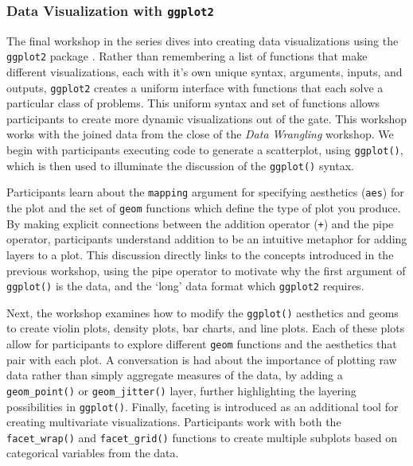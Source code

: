 \documentclass[12pt]{article}
\begin{document}
\subsubsection{Data Visualization with \texttt{ggplot2}}
\label{sec:vizual} 

\quad The final workshop in the series dives into creating data visualizations using the \texttt{ggplot2} package \citep{ggplot}. Rather than remembering a list of functions that make different visualizations, each with it's own unique syntax, arguments, inputs, and outputs, \texttt{ggplot2} creates a uniform interface with functions that each solve a particular class of problems. This uniform syntax and set of functions allows participants to create more dynamic visualizations out of the gate. This workshop works with the joined data from the close of the \emph{Data Wrangling} workshop. We begin with participants executing code to generate a scatterplot, using \texttt{ggplot()}, which is then used to illuminate the discussion of the \texttt{ggplot()} syntax.


\quad Participants learn about the \texttt{mapping} argument for specifying aesthetics (\texttt{aes}) for the plot and the set of \texttt{geom} functions which define the type of plot you produce. By making explicit connections between the addition operator (\texttt{+}) and the pipe operator, participants understand addition to be an intuitive metaphor for adding layers to a plot. This discussion directly links to the concepts introduced in the previous workshop, using the pipe operator to motivate why the first argument of \texttt{ggplot()} is the data, and the `long' data format which \texttt{ggplot2} requires. 

\quad Next, the workshop examines how to modify the \texttt{ggplot()} aesthetics and geoms to create violin plots, density plots, bar charts, and line plots. Each of these plots allow for participants to explore different \texttt{geom} functions and the aesthetics that pair with each plot. A conversation is had about the importance of plotting raw data rather than simply aggregate measures of the data, by adding a \texttt{geom\_point()} or \texttt{geom\_jitter()} layer, further highlighting the layering possibilities in \texttt{ggplot()}. Finally, faceting is introduced as an additional tool for creating multivariate visualizations. Participants work with both the \texttt{facet\_wrap()} and \texttt{facet\_grid()} functions to create multiple subplots based on categorical variables from the data. 
\end{document}
